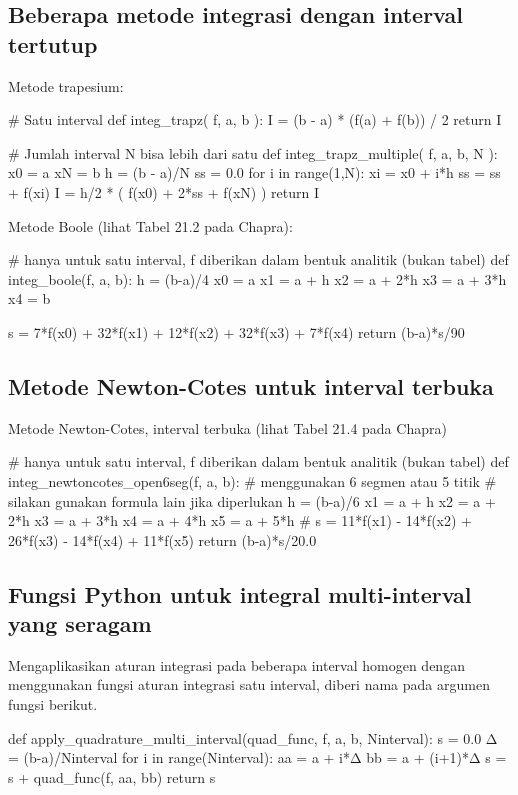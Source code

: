 \subsection*{Beberapa metode integrasi dengan interval tertutup}

Metode trapesium:
\begin{pythoncode}
# Satu interval
def integ_trapz( f, a, b ):
    I = (b - a) * (f(a) + f(b)) / 2
    return I

# Jumlah interval N bisa lebih dari satu
def integ_trapz_multiple( f, a, b, N ):
    x0 = a
    xN = b
    h = (b - a)/N
    ss = 0.0
    for i in range(1,N):
        xi = x0 + i*h
        ss = ss + f(xi)
    I = h/2 * ( f(x0) + 2*ss + f(xN) )
    return I
\end{pythoncode}

Metode Boole (lihat Tabel 21.2 pada Chapra):
\begin{pythoncode}
# hanya untuk satu interval, f diberikan dalam bentuk analitik (bukan tabel)
def integ_boole(f, a, b):
    h = (b-a)/4
    x0 = a
    x1 = a + h
    x2 = a + 2*h
    x3 = a + 3*h
    x4 = b

    s = 7*f(x0) + 32*f(x1) + 12*f(x2) + 32*f(x3) + 7*f(x4)
    return (b-a)*s/90
\end{pythoncode}

\subsection*{Metode Newton-Cotes untuk interval terbuka}

Metode Newton-Cotes, interval terbuka (lihat Tabel 21.4 pada Chapra)
\begin{pythoncode}
# hanya untuk satu interval, f diberikan dalam bentuk analitik (bukan tabel)
def integ_newtoncotes_open6seg(f, a, b):
    # menggunakan 6 segmen atau 5 titik
    # silakan gunakan formula lain jika diperlukan
    h = (b-a)/6
    x1 = a + h
    x2 = a + 2*h
    x3 = a + 3*h
    x4 = a + 4*h
    x5 = a + 5*h
    #
    s = 11*f(x1) - 14*f(x2) + 26*f(x3) - 14*f(x4) + 11*f(x5)
    return (b-a)*s/20.0
\end{pythoncode}


\subsection*{Fungsi Python untuk integral multi-interval yang seragam}

Mengaplikasikan aturan integrasi pada beberapa interval homogen
dengan menggunakan fungsi aturan integrasi satu interval, diberi nama
 pada argumen fungsi berikut.
\begin{pythoncode}
def apply_quadrature_multi_interval(quad_func, f, a, b, Ninterval):
    s = 0.0
    Δ = (b-a)/Ninterval
    for i in range(Ninterval):
        aa = a + i*Δ
        bb = a + (i+1)*Δ
        s = s + quad_func(f, aa, bb)
    return s
\end{pythoncode}

